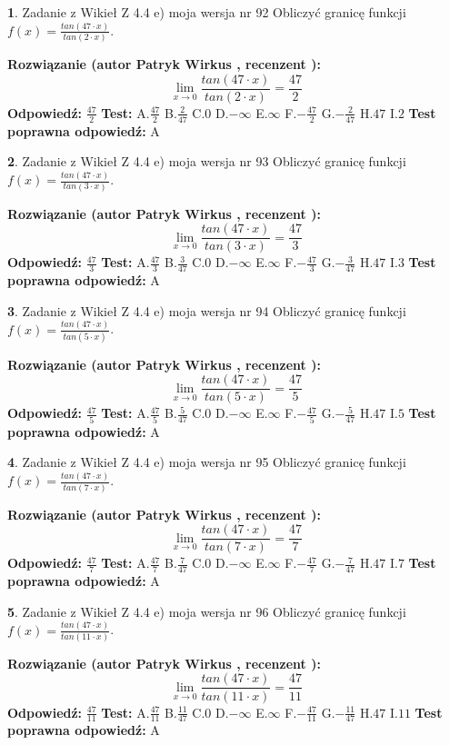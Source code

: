 \documentclass[12pt, a4paper]{article}
\theoremstyle{definition} %
\newtheorem{zad}{}
\newcommand{\zadStart}[1]{\begin{zad}#1\newline}
\newcommand{\zadStop}{\end{zad}}
\newcommand{\rozwStart}[2]{\noindent \textbf{Rozwiązanie (autor #1 , recenzent #2): }\newline}
\newcommand{\rozwStop}{\newline}
\newcommand{\odpStart}{\noindent \textbf{Odpowiedź:}\newline}
\newcommand{\odpStop}{\newline}
\newcommand{\testStart}{\noindent \textbf{Test:}\newline}
\newcommand{\testStop}{\newline}
\newcommand{\kluczStart}{\noindent \textbf{Test poprawna odpowiedź:}\newline}
\newcommand{\kluczStop}{\newline}
\begin{document}
\zadStart{Zadanie z Wikieł Z 4.4 e) moja wersja nr 92}
Obliczyć granicę funkcji $f(x)=\frac{tan(47\cdot x)}{tan(2\cdot x)}$.
\zadStop
\rozwStart{Patryk Wirkus}{}
$$\lim\limits_{x\to 0}\frac{tan(47\cdot x)}{tan(2\cdot x)}=
\frac{47}{2}$$
\rozwStop
\odpStart
$\frac{47}{2}$
\odpStop
\testStart
A.$\frac{47}{2}$
B.$\frac{2}{47}$
C.$0$
D.$-\infty$
E.$\infty$
F.$-\frac{47}{2}$
G.$-\frac{2}{47}$
H.$47$
I.$2$
\testStop
\kluczStart
A
\kluczStop



\zadStart{Zadanie z Wikieł Z 4.4 e) moja wersja nr 93}
Obliczyć granicę funkcji $f(x)=\frac{tan(47\cdot x)}{tan(3\cdot x)}$.
\zadStop
\rozwStart{Patryk Wirkus}{}
$$\lim\limits_{x\to 0}\frac{tan(47\cdot x)}{tan(3\cdot x)}=
\frac{47}{3}$$
\rozwStop
\odpStart
$\frac{47}{3}$
\odpStop
\testStart
A.$\frac{47}{3}$
B.$\frac{3}{47}$
C.$0$
D.$-\infty$
E.$\infty$
F.$-\frac{47}{3}$
G.$-\frac{3}{47}$
H.$47$
I.$3$
\testStop
\kluczStart
A
\kluczStop



\zadStart{Zadanie z Wikieł Z 4.4 e) moja wersja nr 94}
Obliczyć granicę funkcji $f(x)=\frac{tan(47\cdot x)}{tan(5\cdot x)}$.
\zadStop
\rozwStart{Patryk Wirkus}{}
$$\lim\limits_{x\to 0}\frac{tan(47\cdot x)}{tan(5\cdot x)}=
\frac{47}{5}$$
\rozwStop
\odpStart
$\frac{47}{5}$
\odpStop
\testStart
A.$\frac{47}{5}$
B.$\frac{5}{47}$
C.$0$
D.$-\infty$
E.$\infty$
F.$-\frac{47}{5}$
G.$-\frac{5}{47}$
H.$47$
I.$5$
\testStop
\kluczStart
A
\kluczStop



\zadStart{Zadanie z Wikieł Z 4.4 e) moja wersja nr 95}
Obliczyć granicę funkcji $f(x)=\frac{tan(47\cdot x)}{tan(7\cdot x)}$.
\zadStop
\rozwStart{Patryk Wirkus}{}
$$\lim\limits_{x\to 0}\frac{tan(47\cdot x)}{tan(7\cdot x)}=
\frac{47}{7}$$
\rozwStop
\odpStart
$\frac{47}{7}$
\odpStop
\testStart
A.$\frac{47}{7}$
B.$\frac{7}{47}$
C.$0$
D.$-\infty$
E.$\infty$
F.$-\frac{47}{7}$
G.$-\frac{7}{47}$
H.$47$
I.$7$
\testStop
\kluczStart
A
\kluczStop



\zadStart{Zadanie z Wikieł Z 4.4 e) moja wersja nr 96}
Obliczyć granicę funkcji $f(x)=\frac{tan(47\cdot x)}{tan(11\cdot x)}$.
\zadStop
\rozwStart{Patryk Wirkus}{}
$$\lim\limits_{x\to 0}\frac{tan(47\cdot x)}{tan(11\cdot x)}=
\frac{47}{11}$$
\rozwStop
\odpStart
$\frac{47}{11}$
\odpStop
\testStart
A.$\frac{47}{11}$
B.$\frac{11}{47}$
C.$0$
D.$-\infty$
E.$\infty$
F.$-\frac{47}{11}$
G.$-\frac{11}{47}$
H.$47$
I.$11$
\testStop
\kluczStart
A
\kluczStop
\end{document}
